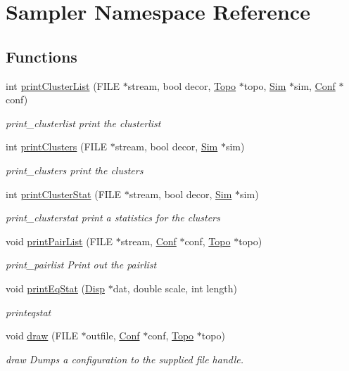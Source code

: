 \hypertarget{namespace_sampler}{\section{Sampler Namespace Reference}
\label{namespace_sampler}
}
\subsection*{Functions}
\begin{DoxyCompactItemize}
\item 
int \hyperlink{namespace_sampler_a13bea6f22970e4ccc9ace89e9195fa94}{print\+Cluster\+List} (F\+I\+L\+E $\ast$stream, bool decor, \hyperlink{struct_topo}{Topo} $\ast$topo, \hyperlink{struct_sim}{Sim} $\ast$sim, \hyperlink{class_conf}{Conf} $\ast$conf)
\begin{DoxyCompactList}\small\item\em print\+\_\+clusterlist print the clusterlist \end{DoxyCompactList}\item 
int \hyperlink{namespace_sampler_a23614f5be575e96bc5d270223da8f25b}{print\+Clusters} (F\+I\+L\+E $\ast$stream, bool decor, \hyperlink{struct_sim}{Sim} $\ast$sim)
\begin{DoxyCompactList}\small\item\em print\+\_\+clusters print the clusters \end{DoxyCompactList}\item 
int \hyperlink{namespace_sampler_a0915f217c51d156f66b86ed2db795661}{print\+Cluster\+Stat} (F\+I\+L\+E $\ast$stream, bool decor, \hyperlink{struct_sim}{Sim} $\ast$sim)
\begin{DoxyCompactList}\small\item\em print\+\_\+clusterstat print a statistics for the clusters \end{DoxyCompactList}\item 
void \hyperlink{namespace_sampler_a542071e3c87f752a29a307cb375d4bb0}{print\+Pair\+List} (F\+I\+L\+E $\ast$stream, \hyperlink{class_conf}{Conf} $\ast$conf, \hyperlink{struct_topo}{Topo} $\ast$topo)
\begin{DoxyCompactList}\small\item\em print\+\_\+pairlist Print out the pairlist \end{DoxyCompactList}\item 
void \hyperlink{namespace_sampler_a363829ca62608880b9a1b72c1c7ac086}{print\+Eq\+Stat} (\hyperlink{struct_disp}{Disp} $\ast$dat, double scale, int length)
\begin{DoxyCompactList}\small\item\em printeqstat \end{DoxyCompactList}\item 
void \hyperlink{namespace_sampler_a32d60975233913275414c82e17009262}{draw} (F\+I\+L\+E $\ast$outfile, \hyperlink{class_conf}{Conf} $\ast$conf, \hyperlink{struct_topo}{Topo} $\ast$topo)
\begin{DoxyCompactList}\small\item\em draw Dumps a configuration to the supplied file handle. \end{DoxyCompactList}\end{DoxyCompactItemize}


